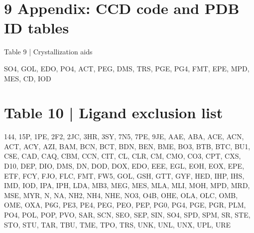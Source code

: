 \documentclass[10pt]{article}
\begin{document}
\section*{9 Appendix: CCD code and PDB ID tables}
Table 9 | Crystallization aids

SO4, GOL, EDO, PO4, ACT, PEG, DMS, TRS, PGE, PG4, FMT, EPE, MPD, MES, CD, IOD

\section*{Table 10 | Ligand exclusion list}
144, 15P, 1PE, 2F2, 2JC, 3HR, 3SY, 7N5, 7PE, 9JE, AAE, ABA, ACE, ACN, ACT, ACY, AZI, BAM, BCN, BCT, BDN, BEN, BME, BO3, BTB, BTC, BU1, C8E, CAD, CAQ, CBM, CCN, CIT, CL, CLR, CM, CMO, CO3, CPT, CXS, D10, DEP, DIO, DMS, DN, DOD, DOX, EDO, EEE, EGL, EOH, EOX, EPE, ETF, FCY, FJO, FLC, FMT, FW5, GOL, GSH, GTT, GYF, HED, IHP, IHS, IMD, IOD, IPA, IPH, LDA, MB3, MEG, MES, MLA, MLI, MOH, MPD, MRD, MSE, MYR, N, NA, NH2, NH4, NHE, NO3, O4B, OHE, OLA, OLC, OMB, OME, OXA, P6G, PE3, PE4, PEG, PEO, PEP, PG0, PG4, PGE, PGR, PLM, PO4, POL, POP, PVO, SAR, SCN, SEO, SEP, SIN, SO4, SPD, SPM, SR, STE, STO, STU, TAR, TBU, TME, TPO, TRS, UNK, UNL, UNX, UPL, URE
\end{document}
